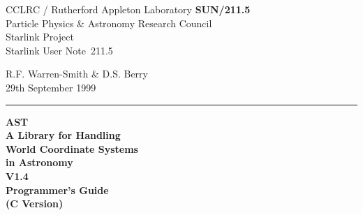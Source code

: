 \documentclass[twoside,11pt]{article}
\newcommand{\stardoccategory}  {Starlink User Note}
\newcommand{\stardocinitials}  {SUN}
\newcommand{\stardocnumber}    {211.5}
\newcommand{\stardocauthors}   {R.F. Warren-Smith \& D.S. Berry}
\newcommand{\stardocdate}      {29th September 1999}
\newcommand{\stardoctitle}     {AST\\
                                A Library for Handling\\
                                World Coordinate Systems\\
                                in Astronomy}
\newcommand{\stardocversion}   {V1.4}
\newcommand{\stardocmanual}    {Programmer's Guide\\(C Version)}
\newcommand{\stardocname}{\stardocinitials /\stardocnumber}
\newenvironment{latexonly}{}{}
\begin{document}
\thispagestyle{empty}

\begin{latexonly}
   CCLRC / {\sc Rutherford Appleton Laboratory} \hfill {\bf \stardocname}\\
   {\large Particle Physics \& Astronomy Research Council}\\
   {\large Starlink Project\\}
   {\large \stardoccategory\ \stardocnumber}
   \begin{flushright}
   \stardocauthors\\
   \stardocdate
   \end{flushright}
   \vspace{-4mm}
   \rule{\textwidth}{0.5mm}
   \vspace{-7mm}
   \begin{center}
   {\Huge\bf  \stardoctitle \\ [2.0ex]}
   {\LARGE\bf \stardocversion \\ [1.0ex]}
   {\Huge\bf  \stardocmanual}
   \end{center}


\end{latexonly}
\end{document}
